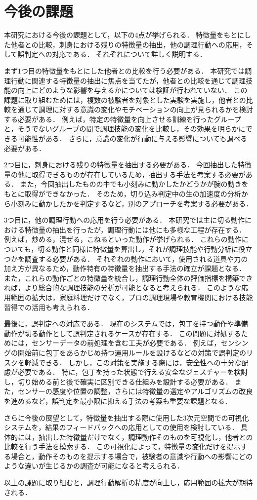 \section{今後の課題}
本研究における今後の課題として，以下の4点が挙げられる．
特徴量をもとにした他者との比較，刺身における残りの特徴量の抽出，他の調理行動への応用，そして誤判定への対応である．
それぞれについて詳しく説明する．

まず1つ目の特徴量をもとにした他者との比較を行う必要がある．
本研究では調理行動に関連する特徴量の抽出に焦点を当てたが，他者との比較を通じて調理技能の向上にどのような影響を与えるかについては検証が行われていない．
この課題に取り組むためには，複数の被験者を対象とした実験を実施し，他者との比較を通じて調理に対する意識の変化やモチベーションの向上が見られるかを検討する必要がある．
例えば，特定の特徴量を向上させる訓練を行ったグループと，そうでないグループの間で調理技能の変化を比較し，その効果を明らかにできる可能性がある．
さらに，意識の変化が行動に与える影響についても調べる必要がある．

2つ目に，刺身における残りの特徴量を抽出する必要がある．
今回抽出した特徴量の他に取得できるものが存在しているため，抽出する手法を考案する必要がある．
また，今回抽出したものの中でも小刻みに動かしたかどうかが腕の動きをもとに取得ができなかった．
そのため，切り込み判定中の生の加速度の分析から小刻みに動かしたかを判定するなど，別のアプローチを考案する必要がある．


3つ目に，他の調理行動への応用を行う必要がある．
本研究では主に切る動作における特徴量の抽出を行ったが，調理行動には他にも多様な工程が存在する．
例えば，炒める，混ぜる，こねるといった動作が挙げられる．
これらの動作についても，切る動作と同様に特徴量を算出し，それが調理技能や行動分析に役立つかを調査する必要がある．
それぞれの動作において，使用される道具や力の加え方が異なるため，動作特有の特徴量を抽出する手法の確立が課題となる．
また，これらの動作ごとの特徴量を統合し，調理行動全体の評価指標を構築できれば，より総合的な調理技能の分析が可能となると考えられる．
このような応用範囲の拡大は，家庭料理だけでなく，プロの調理現場や教育機関における技能習得での活用も考えられる．

最後に，誤判定への対応である．
現在のシステムでは，包丁を持つ動作や準備動作が切る動作として誤判定されるケースが存在する．
この問題に対処するためには，センサーデータの前処理を含む工夫が必要である．
例えば，センシングの開始前に包丁をあらかじめ持つ運用ルールを設けるなどの対策で誤判定のリスクを軽減できる．
しかし，この対策を実施する際には，安全性への十分な配慮が必要である．
特に，包丁を持った状態で行える安全なジェスチャーを検討し，切り始める前と後で確実に区別できる仕組みを設計する必要がある．
また，センサーの感度や位置の調整，さらには特徴量の選定やアルゴリズムの改良を進めるなど，誤判定を最小限に抑える手法の考案も重要な課題となる．

さらに今後の展望として，特徴量を抽出する際に使用した3次元空間での可視化システムを，結果のフィードバックへの応用としての使用を検討している．
具体的には，抽出した特徴量だけでなく，調理動作そのものを可視化し，他者との比較を行う手法を模索する．
この可視化によって，特徴量の変化だけを提示する場合と，動作そのものを提示する場合で，被験者の意識や行動への影響にどのような違いが生じるかの調査が可能になると考えられる．

以上の課題に取り組むと，調理行動解析の精度が向上し，応用範囲の拡大が期待される．